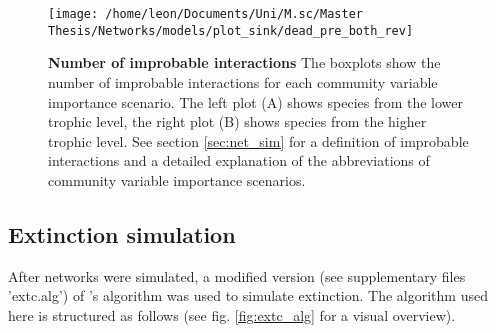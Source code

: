 \documentclass[12pt,a4paper]{article}
\begin{document}
\begin{figure}[H]
	 \texttt{[image: /home/leon/Documents/Uni/M.sc/Master Thesis/Networks/models/plot\_sink/dead\_pre\_both\_rev]}
	 \caption{\textbf{Number of improbable interactions} The boxplots show the number of improbable interactions for each community variable importance scenario.
	 The left plot (A) shows species from the lower trophic level, the right plot (B) shows species from the higher trophic level. See section \ref{sec:net_sim} for a definition of improbable interactions and a detailed explanation of the abbreviations of community variable importance scenarios.}
	 \label{fig:dead_int}
\end{figure}


	\subsection{Extinction simulation} \label{sec:extc_sim}
	After networks were simulated, a modified version (see supplementary files 'extc.alg') of \citeauthor{Vizentin-Bugoni2019}'s algorithm was used to simulate extinction. The algorithm used here is structured as follows (see fig. \ref{fig:extc_alg} for a visual overview). 
\end{document}
